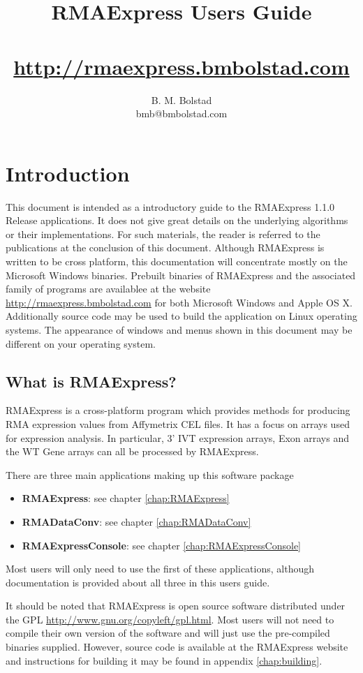 \documentclass[11pt]{report}
\title{RMAExpress Users Guide \\ {\small \curversion} \\ {\small \url{http://rmaexpress.bmbolstad.com}}}
\author{B. M. Bolstad \\ bmb@bmbolstad.com}
\newcommand{\curversion}{1.1.0 Release }
\begin{document}
\maketitle

\tableofcontents

\chapter{Introduction}

This document is intended as a introductory guide to the RMAExpress \curversion applications. It does not give great details on the underlying algorithms or their implementations. For such materials, the reader is referred to the publications at the conclusion of this document. Although RMAExpress is written to be cross platform, this documentation will concentrate mostly on the Microsoft Windows binaries. Prebuilt binaries of RMAExpress and the associated family of programs are availablee at the website \url{http://rmaexpress.bmbolstad.com} for both Microsoft Windows and Apple OS X. Additionally source code may be used to build the application on Linux operating systems.  The appearance of windows and menus shown in this document may be different on your operating system.

\section{What is RMAExpress?}

RMAExpress is a cross-platform program which provides methods for producing RMA expression values from Affymetrix CEL files. It has a focus on arrays used for expression analysis. In particular, 3' IVT expression arrays, Exon arrays and the WT Gene arrays can all be processed by RMAExpress.

There are three main applications making up this software package
\begin{itemize}
\item {\bf RMAExpress}: see chapter \ref{chap:RMAExpress}
\item {\bf RMADataConv}: see chapter \ref{chap:RMADataConv}
\item {\bf RMAExpressConsole}: see chapter \ref{chap:RMAExpressConsole}
\end{itemize}

Most users will only need to use the first of these applications, although documentation is provided about all three in this users guide. 

It should be noted that RMAExpress is open source software distributed under the GPL  \url{http://www.gnu.org/copyleft/gpl.html}. Most users will not need to compile their own version of the software and will just use the pre-compiled binaries supplied. However, source code is available at the RMAExpress website and instructions for building it may be found in appendix \ref{chap:building}.
\end{document}
